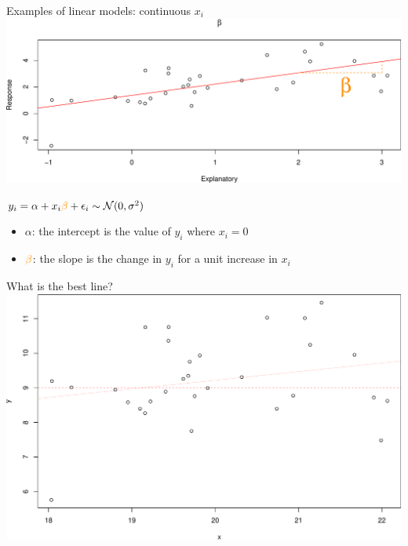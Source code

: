 \documentclass[
  ignorenonframetext,
]{beamer}
\providecommand{\tightlist}{%
  \setlength{\itemsep}{0pt}\setlength{\parskip}{0pt}}
\begin{document}
\begin{frame}{Examples of linear models: continuous \(x_i\)}
\protect\hypertarget{examples-of-linear-models-continuous-x_i-1}{}
\includegraphics{IntroLM_files/figure-beamer/reg2-1.pdf}

\(y_i = \alpha + x_i\textcolor{darkorange}{\beta} + \epsilon_i\sim \mathcal{N}(0,\sigma^2)\)

\begin{itemize}
\tightlist
\item
  \(\alpha\): the intercept is the value of \(y_i\) where \(x_i = 0\)
\item
  \(\textcolor{darkorange}{\beta}\): the slope is the change in \(y_i\)
  for a unit increase in \(x_i\)
\end{itemize}
\end{frame}

\begin{frame}{What is the best line?}
\protect\hypertarget{what-is-the-best-line}{}
\includegraphics{IntroLM_files/figure-beamer/norm2-1.pdf}
\end{frame}
\end{document}
